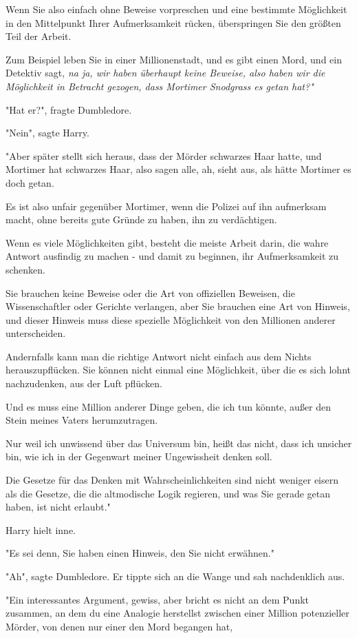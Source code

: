 {Wenn Sie also einfach ohne Beweise vorpreschen und eine bestimmte Möglichkeit in den Mittelpunkt Ihrer Aufmerksamkeit rücken, überspringen Sie den größten Teil der Arbeit.

Zum Beispiel leben Sie in einer Millionenstadt, und es gibt einen Mord, und ein Detektiv sagt, \emph{na ja, wir haben überhaupt keine Beweise, also haben wir die Möglichkeit in Betracht gezogen, dass Mortimer Snodgrass es getan hat?"}

"Hat er?", fragte Dumbledore.

"Nein", sagte Harry.

"Aber später stellt sich heraus, dass der Mörder schwarzes Haar hatte, und Mortimer hat schwarzes Haar, also sagen alle, ah, sieht aus, als hätte Mortimer es doch getan.

Es ist also unfair gegenüber Mortimer, wenn die Polizei auf ihn aufmerksam macht, ohne bereits gute Gründe zu haben, ihn zu verdächtigen.

Wenn es viele Möglichkeiten gibt, besteht die meiste Arbeit darin, die wahre Antwort ausfindig zu machen - und damit zu beginnen, ihr Aufmerksamkeit zu schenken.

Sie brauchen keine Beweise oder die Art von offiziellen Beweisen, die Wissenschaftler oder Gerichte verlangen, aber Sie brauchen eine Art von Hinweis, und dieser Hinweis muss diese spezielle Möglichkeit von den Millionen anderer unterscheiden.

Andernfalls kann man die richtige Antwort nicht einfach aus dem Nichts herauszupflücken. Sie können nicht einmal eine Möglichkeit, über die es sich lohnt nachzudenken, aus der Luft pflücken.

Und es muss eine Million anderer Dinge geben, die ich tun könnte, außer den Stein meines Vaters herumzutragen.

Nur weil ich unwissend über das Universum bin, heißt das nicht, dass ich unsicher bin, wie ich in der Gegenwart meiner Ungewissheit denken soll.

Die Gesetze für das Denken mit Wahrscheinlichkeiten sind nicht weniger eisern als die Gesetze, die die altmodische Logik regieren, und was Sie gerade getan haben, ist nicht erlaubt."

Harry hielt inne.

"Es sei denn, Sie haben einen Hinweis, den Sie nicht erwähnen."

"Ah", sagte Dumbledore. Er tippte sich an die Wange und sah nachdenklich aus.

"Ein interessantes Argument, gewiss, aber bricht es nicht an dem Punkt zusammen, an dem du eine Analogie herstellst zwischen einer Million potenzieller Mörder, von denen nur einer den Mord begangen hat,

}
